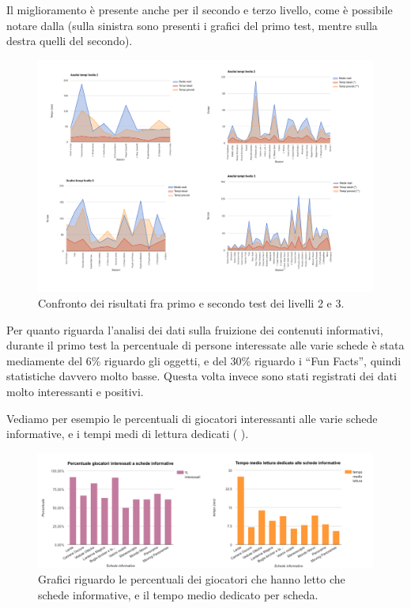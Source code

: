 Il miglioramento è presente anche per il secondo e terzo livello, come è possibile notare dalla \myfig{\ref{fig:test-confronto-tempi2-3}} (sulla sinistra sono presenti i grafici del primo test, mentre sulla destra quelli del secondo).

\begin{figure}[h]
\centerline{\includegraphics[scale=0.35]{images/risultati/test-confronto-tempi2-3.png}}
\caption{Confronto dei risultati fra primo e secondo test dei livelli 2 e 3.}
\label{fig:test-confronto-tempi2-3}
\end{figure}

Per quanto riguarda l'analisi dei dati sulla fruizione dei contenuti informativi, durante il primo test la percentuale di persone interessate alle varie schede è stata mediamente del 6\% riguardo gli oggetti, e del 30\% riguardo i ``Fun Facts'', quindi statistiche davvero molto basse. Questa volta invece sono stati registrati dei dati molto interessanti e positivi.

Vediamo per esempio le percentuali di giocatori interessanti alle varie schede informative, e i tempi medi di lettura dedicati ( \myfig{\ref{fig:test-percTempiSchede}}).

\begin{figure}[h]
\centerline{\includegraphics[scale=0.4]{images/risultati/test_seriousStats.png}}
\caption{Grafici riguardo le percentuali dei giocatori che hanno letto che schede informative, e il tempo medio dedicato per scheda.}
\label{fig:test-percTempiSchede}
\end{figure}

